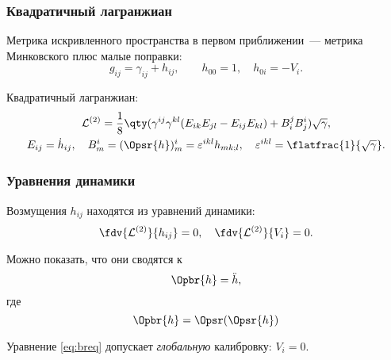 \documentclass[compress]{beamer}
\begin{document}
    \begin{frame}\frametitle{Квадратичный лагранжиан}

        Метрика искривленного пространства в первом приближении~--- метрика Минковского плюс малые поправки:
        \begin{equation*}
            g_{ij} = \gamma_{ij} + h_{ij}, \qquad h_{00} = 1, \quad h_{0i} = -V_i .
        \end{equation*}

        Квадратичный лагранжиан:
        \begin{equation}\begin{gathered}\label{eq:lagr}
            \mathcal{L}^{(2)} = \frac{1}{8} \qty(
                \gamma^{ij}\gamma^{kl} (E_{ik}E_{jl} - E_{ij}E_{kl}) + B_i^j B_j^i
            ) \sqrt{\gamma} , \\
            E_{ij} = \dot{h}_{ij}, \quad
            B^i_m = (\Opsr{h})^i_m = \varepsilon^{ikl} h_{mk;l}, \quad
            \varepsilon^{ikl} = \flatfrac{1}{\sqrt{\gamma}}.
        \end{gathered}\end{equation}

    \end{frame}


    \begin{frame}\frametitle{Уравнения динамики}

        Возмущения $h_{ij}$ находятся из уравнений динамики:
        \begin{equation*}
            \fdv{\mathcal{L}^{(2)}}{h_{ij}} = 0, \quad
            \fdv{\mathcal{L}^{(2)}}{V_i} = 0 .
        \end{equation*}

        Можно показать, что они сводятся к
        \begin{equation}\label{eq:breq}
            \Opbr{h} = \ddot{h} ,
        \end{equation}
        где
        \begin{equation*}
            \Opbr{h} = \Opsr(\Opsr{h})
        \end{equation*}

        Уравнение \autoref{eq:breq} допускает \textit{глобальную} калибровку: $V_i = 0$.

    \end{frame}
\end{document}
